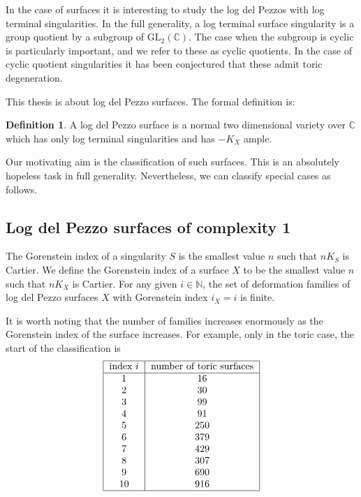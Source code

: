 \documentclass[12pt,a4paper]{book}      %
\theoremstyle{definition}
\newtheorem{dfn}[thm]{Definition}
\newcommand{\mb}[1]{\mathbb{#1}}
\newcommand{\gl}{\text{GL}_2 (\mathbb{C})}
\begin{document}
 
 


In the case of surfaces it is interesting to study the log del Pezzos with log terminal singularities. In the full generality, a log terminal surface singularity is a group quotient by a subgroup of $\gl$. The case when the subgroup is cyclic is particularly important, and we refer to these as cyclic quotients. In the case of cyclic quotient singularities it has been conjectured that these admit toric degeneration.

This thesis is about log del Pezzo surfaces. The formal definition is:
\begin{dfn}\label{beginnersdef}
A log del Pezzo surface is a normal two dimensional variety over $\mb{C}$ which has only log terminal singularities and has $-K_X$ ample.
\end{dfn}

Our motivating aim is the classification of such surfaces.
This is an absolutely hopeless task in full generality.
Nevertheless, we can classify special cases as follows.

\subsection{Log del Pezzo surfaces of complexity 1}
The Gorenstein index of a singularity $S$ is the smallest value $n$ such that $n K_S$ is Cartier. We define the Gorenstein index of a surface $X$ to be the smallest value $n$ such that $nK_X$ is Cartier.
For any given $i \in \mathbb{N}$, the set of deformation
families of log del Pezzo surfaces $X$ with Gorenstein index $i_X=i$
is finite.

It is worth noting that the number of families increases enormously as the Gorenstein
index of the surface increases. For example, only in the toric case, 
the start of the classification is
\[
\begin{tabular}{| c | c |}
\hline
\text{index $i$} & \text{number of toric surfaces}\\ \hline
1 & 16 \\
2 & 30 \\
3 & 99  \\
4 & 91  \\
5 & 250 \\
6 & 379 \\
7 & 429 \\
8 & 307 \\
9 & 690 \\
10 & 916 \\
\hline
\end{tabular}
\]
\end{document}
